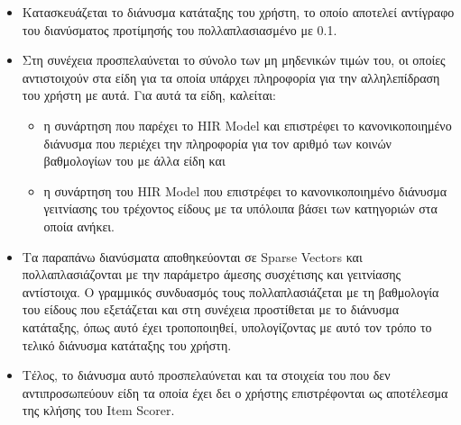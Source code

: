 \begin{itemize}
\item Κατασκευάζεται το διάνυσμα κατάταξης του χρήστη, το οποίο αποτελεί αντί\-γραφο του διανύσματος προτίμησής του πολλαπλασιασμένο με 0.1.\\
\item Στη συνέχεια προσπελαύνεται το σύνολο των μη μηδενικών τιμών του, οι οποίες αντιστοιχούν στα είδη για τα οποία υπάρχει πληροφορία για την αλληλεπίδραση του χρήστη με αυτά. Για αυτά τα είδη, καλείται:
\begin{itemize}
\item η συνάρτηση που παρέχει το {\en HIR Model} και επιστρέφει το κανονικοποιημένο διάνυσμα που περιέχει την πληροφορία για τον αριθμό των κοινών βαθμολογίων του με άλλα είδη και
\item η συνάρτηση του {\en HIR Model} που επιστρέφει το κανονικοποιημένο διά\-νυσμα γειτνίασης του τρέχοντος είδους με τα υπόλοιπα βάσει των κατηγοριών στα οποία ανήκει. 
\end{itemize}
\item Τα παραπάνω διανύσματα αποθηκεύονται σε {\en Sparse Vectors} και πολλαπλασιάζονται με την παράμετρο άμεσης συσχέτισης και γειτνίασης αντίστοιχα. Ο γραμμικός συνδυασμός τους πολλαπλασιάζεται με τη βαθμολογία του είδους που εξετάζεται και στη συνέχεια προστίθεται με το διάνυσμα κατάταξης, όπως αυτό έχει τροποποιηθεί, υπολογίζοντας με αυτό τον τρόπο το τελικό διάνυσμα κατάταξης του χρήστη. 
\item Τέλος, το διάνυσμα αυτό προσπελαύνεται και τα στοιχεία του που δεν αντι\-προσωπεύουν είδη τα οποία έχει δει ο χρήστης επιστρέφονται ως αποτέλεσμα της κλήσης του {\en Item Scorer}.
\end{itemize}
